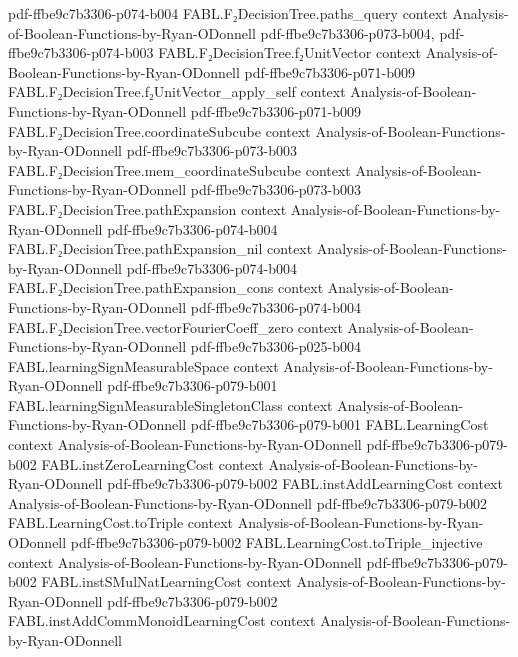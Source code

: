 \begin{theorem}
{    pdf-ffbe9c7b3306-p074-b004}
\proofstep
  {FABL.F₂DecisionTree.paths_query}
  {context}
  {Analysis-of-Boolean-Functions-by-Ryan-ODonnell}
  {pdf-ffbe9c7b3306-p073-b004,
    pdf-ffbe9c7b3306-p074-b003}
\proofstep
  {FABL.F₂DecisionTree.f₂UnitVector}
  {context}
  {Analysis-of-Boolean-Functions-by-Ryan-ODonnell}
  {pdf-ffbe9c7b3306-p071-b009}
\proofstep
  {FABL.F₂DecisionTree.f₂UnitVector_apply_self}
  {context}
  {Analysis-of-Boolean-Functions-by-Ryan-ODonnell}
  {pdf-ffbe9c7b3306-p071-b009}
\proofstep
  {FABL.F₂DecisionTree.coordinateSubcube}
  {context}
  {Analysis-of-Boolean-Functions-by-Ryan-ODonnell}
  {pdf-ffbe9c7b3306-p073-b003}
\proofstep
  {FABL.F₂DecisionTree.mem_coordinateSubcube}
  {context}
  {Analysis-of-Boolean-Functions-by-Ryan-ODonnell}
  {pdf-ffbe9c7b3306-p073-b003}
\proofstep
  {FABL.F₂DecisionTree.pathExpansion}
  {context}
  {Analysis-of-Boolean-Functions-by-Ryan-ODonnell}
  {pdf-ffbe9c7b3306-p074-b004}
\proofstep
  {FABL.F₂DecisionTree.pathExpansion_nil}
  {context}
  {Analysis-of-Boolean-Functions-by-Ryan-ODonnell}
  {pdf-ffbe9c7b3306-p074-b004}
\proofstep
  {FABL.F₂DecisionTree.pathExpansion_cons}
  {context}
  {Analysis-of-Boolean-Functions-by-Ryan-ODonnell}
  {pdf-ffbe9c7b3306-p074-b004}
\proofstep
  {FABL.F₂DecisionTree.vectorFourierCoeff_zero}
  {context}
  {Analysis-of-Boolean-Functions-by-Ryan-ODonnell}
  {pdf-ffbe9c7b3306-p025-b004}
\proofstep
  {FABL.learningSignMeasurableSpace}
  {context}
  {Analysis-of-Boolean-Functions-by-Ryan-ODonnell}
  {pdf-ffbe9c7b3306-p079-b001}
\proofstep
  {FABL.learningSignMeasurableSingletonClass}
  {context}
  {Analysis-of-Boolean-Functions-by-Ryan-ODonnell}
  {pdf-ffbe9c7b3306-p079-b001}
\proofstep
  {FABL.LearningCost}
  {context}
  {Analysis-of-Boolean-Functions-by-Ryan-ODonnell}
  {pdf-ffbe9c7b3306-p079-b002}
\proofstep
  {FABL.instZeroLearningCost}
  {context}
  {Analysis-of-Boolean-Functions-by-Ryan-ODonnell}
  {pdf-ffbe9c7b3306-p079-b002}
\proofstep
  {FABL.instAddLearningCost}
  {context}
  {Analysis-of-Boolean-Functions-by-Ryan-ODonnell}
  {pdf-ffbe9c7b3306-p079-b002}
\proofstep
  {FABL.LearningCost.toTriple}
  {context}
  {Analysis-of-Boolean-Functions-by-Ryan-ODonnell}
  {pdf-ffbe9c7b3306-p079-b002}
\proofstep
  {FABL.LearningCost.toTriple_injective}
  {context}
  {Analysis-of-Boolean-Functions-by-Ryan-ODonnell}
  {pdf-ffbe9c7b3306-p079-b002}
\proofstep
  {FABL.instSMulNatLearningCost}
  {context}
  {Analysis-of-Boolean-Functions-by-Ryan-ODonnell}
  {pdf-ffbe9c7b3306-p079-b002}
\proofstep
  {FABL.instAddCommMonoidLearningCost}
  {context}
  {Analysis-of-Boolean-Functions-by-Ryan-ODonnell}

\end{theorem}
